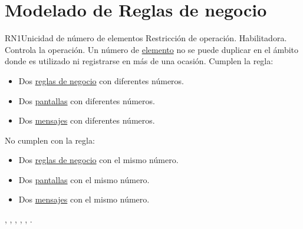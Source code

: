 \section{Modelado de Reglas de negocio}


\begin{BussinesRule}{RN1}{Unicidad de número de elementos}
	\BRitem[Tipo:] Restricción de operación. 
	\BRitem[Clase:] Habilitadora. 
	\BRitem[Nivel:] Controla la operación. %
	\BRitem[Descripción:] Un número de \hyperlink{tElemento}{elemento} no se puede duplicar en el ámbito donde es utilizado ni registrarse en más de una ocasión.
	 Cumplen la regla:
	\begin{itemize}
		\item Dos \hyperlink{BREntidad}{reglas de negocio} con diferentes números.
		\item Dos \hyperlink{EntidadPantalla}{pantallas} con diferentes números.
		\item Dos \hyperlink{MSGEntidad}{mensajes} con diferentes números.
	\end{itemize}
	 No cumplen con la regla:
	\begin{itemize}
		\item Dos \hyperlink{BREntidad}{reglas de negocio} con el mismo número.
		\item Dos \hyperlink{EntidadPantalla}{pantallas} con el mismo número.
		\item Dos \hyperlink{MSGEntidad}{mensajes} con el mismo número.
	\end{itemize}
	 , , , , , .
\end{BussinesRule}

